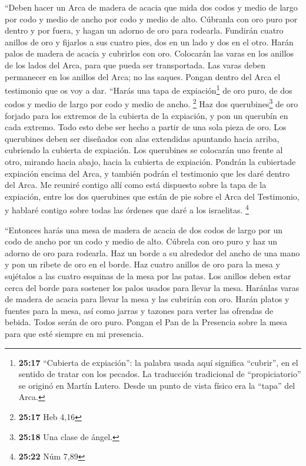  ``Deben hacer un Arca de madera de acacia que mida dos
codos y medio de largo por codo y medio de ancho por codo y medio de
alto.  Cúbranla con oro puro por dentro y por fuera, y
hagan un adorno de oro para rodearla.  Fundirán cuatro
anillos de oro y fijarlos a sus cuatro pies, dos en un lado y dos en el
otro.  Harán palos de madera de acacia y cubrirlos con
oro.  Colocarán las varas en los anillos de los lados del
Arca, para que pueda ser transportada.  Las varas deben
permanecer en los anillos del Arca; no las saques. 
Pongan dentro del Arca el testimonio que os voy a dar. 
``Harás una tapa de expiación\footnote{\textbf{25:17} ``Cubierta de
  expiación'': la palabra usada aquí significa ``cubrir'', en el sentido
  de tratar con los pecados. La traducción tradicional de
  ``propiciatorio'' se originó en Martín Lutero. Desde un punto de vista
  físico era la ``tapa'' del Arca.} de oro puro, de dos codos y medio de
largo por codo y medio de ancho. \footnote{\textbf{25:17} Heb 4,16}
 Haz dos querubines\footnote{\textbf{25:18} Una clase de
  ángel.} de oro forjado para los extremos de la cubierta de la
expiación,  y pon un querubín en cada extremo. Todo esto
debe ser hecho a partir de una sola pieza de oro.  Los
querubines deben ser diseñados con alas extendidas apuntando hacia
arriba, cubriendo la cubierta de expiación. Los querubines se colocarán
uno frente al otro, mirando hacia abajo, hacia la cubierta de expiación.
 Pondrán la cubiertade expiación encima del Arca, y
también podrán el testimonio que les daré dentro del Arca.
 Me reuniré contigo allí como está dispuesto sobre la
tapa de la expiación, entre los dos querubines que están de pie sobre el
Arca del Testimonio, y hablaré contigo sobre todas las órdenes que daré
a los israelitas. \footnote{\textbf{25:22} Núm 7,89}

 ``Entonces harás una mesa de madera de acacia de dos
codos de largo por un codo de ancho por un codo y medio de alto.
 Cúbrela con oro puro y haz un adorno de oro para
rodearla.  Haz un borde a su alrededor del ancho de una
mano y pon un ribete de oro en el borde.  Haz cuatro
anillos de oro para la mesa y sujétalos a las cuatro esquinas de la mesa
por las patas.  Los anillos deben estar cerca del borde
para sostener los palos usados para llevar la mesa. 
Haránlas varas de madera de acacia para llevar la mesa y las cubrirán
con oro.  Harán platos y fuentes para la mesa, así como
jarras y tazones para verter las ofrendas de bebida. Todos serán de oro
puro.  Pongan el Pan de la Presencia sobre la mesa para
que esté siempre en mi presencia.


